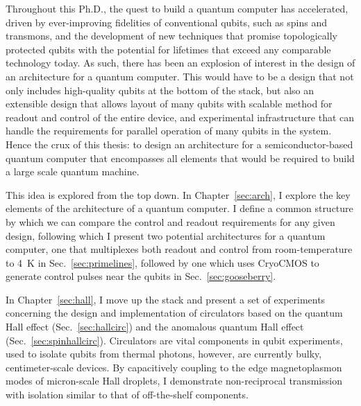 %
%
%
Throughout this Ph.D., the quest to build a quantum computer has accelerated, driven by ever-improving
fidelities of conventional qubits, such as spins and transmons, and the development of new techniques
that promise topologically protected qubits with the potential for lifetimes that exceed any comparable
technology today. As such, there has been an explosion of interest in the design of an architecture for a
quantum computer. This would have to be a design that not only includes high-quality qubits at the bottom of the stack,
but also an extensible design that allows layout of many qubits with scalable method for readout and
control of the entire device, and experimental infrastructure that can handle the requirements for parallel operation
of many qubits in the system. Hence the crux of this thesis: to design an architecture for a semiconductor-based
quantum computer that encompasses all elements that would be required to build a large scale quantum machine.

This idea is explored from the top down. In Chapter~\ref{sec:arch}, I explore the key elements of the
architecture of a quantum computer. I define a common structure by which we can compare the control
and readout requirements for any given design, following which I present two potential architectures for
a quantum computer, one that multiplexes both readout and control from room-temperature to \SI{4}{\kelvin} in
Sec.~\ref{sec:primelines}, followed by one which uses {CryoCMOS} to generate control pulses near the qubits
in Sec.~\ref{sec:gooseberry}.

In Chapter~\ref{sec:hall}, I move up the stack and present a set of experiments concerning the design and
implementation of circulators based on the quantum Hall effect (Sec.~\ref{sec:hallcirc}) and the
anomalous quantum Hall effect (Sec.~\ref{sec:spinhallcirc}). Circulators are vital components in qubit
experiments, used to isolate qubits from thermal photons, however, are currently bulky, centimeter-scale
devices. By capacitively coupling to the edge magnetoplasmon modes of micron-scale Hall droplets,
I demonstrate non-reciprocal transmission with isolation similar to that of off-the-shelf components.

